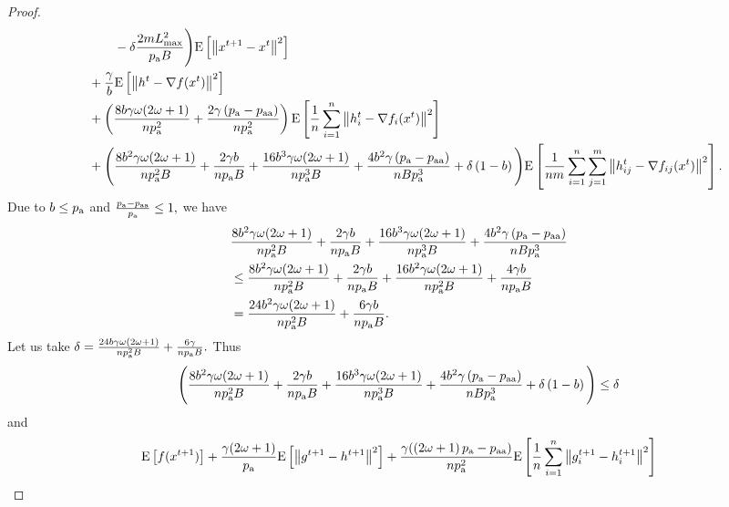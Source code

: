 \documentclass{article}
\newcommand*{\probavailable}{\ensuremath{p_{\textnormal{a}}}}
\newcommand*{\probpairaa}{\ensuremath{p_{\textnormal{aa}}}}
\begin{document}
\begin{proof}
\begin{align*}
      &\qquad\quad - \delta \frac{2 m L_{\max}^2}{\probavailable B} \Bigg) \Exp{\norm{x^{t+1} - x^t}^2} \\
      &\quad + \frac{\gamma}{b} \Exp{\norm{h^{t} - \nabla f(x^{t})}^2} \\
      &\quad + \left(\frac{8 b \gamma \omega (2 \omega + 1)}{n \probavailable^2} + \frac{2 \gamma \left(\probavailable - \probpairaa\right)}{n \probavailable^2}\right)\Exp{\frac{1}{n}\sum_{i=1}^n\norm{h^{t}_i - \nabla f_i(x^{t})}^2} \\
      &\quad + \Bigg(\frac{8 b^2 \gamma \omega (2 \omega + 1)}{n \probavailable^2 B} + \frac{2 \gamma b}{n \probavailable B} + \frac{16 b^3 \gamma \omega (2 \omega + 1)}{n \probavailable^3 B} + \frac{4 b^2 \gamma \left(\probavailable - \probpairaa\right)}{n B \probavailable^3} + \delta \left(1 - b\right)\Bigg)\Exp{\frac{1}{nm}\sum_{i=1}^n\sum_{j=1}^m\norm{h^{t}_{ij} - \nabla f_{ij}(x^{t})}^2}.
    \end{align*}
    Due to $b \leq \probavailable$ and $\frac{\probavailable - \probpairaa}{\probavailable} \leq 1,$ we have
    \begin{align*}
      &\frac{8 b^2 \gamma \omega (2 \omega + 1)}{n \probavailable^2 B} + \frac{2 \gamma b}{n \probavailable B} + \frac{16 b^3 \gamma \omega (2 \omega + 1)}{n \probavailable^3 B} + \frac{4 b^2 \gamma \left(\probavailable - \probpairaa\right)}{n B \probavailable^3} \\
      &\leq \frac{8 b^2 \gamma \omega (2 \omega + 1)}{n \probavailable^2 B} + \frac{2 \gamma b}{n \probavailable B} + \frac{16 b^2 \gamma \omega (2 \omega + 1)}{n \probavailable^2 B} + \frac{4 \gamma b}{n \probavailable B} \\
      &=\frac{24 b^2 \gamma \omega (2 \omega + 1)}{n \probavailable^2 B} + \frac{6 \gamma b}{n \probavailable B}.
    \end{align*}
    Let us take $\delta = \frac{24 b \gamma \omega (2 \omega + 1)}{n \probavailable^2 B} + \frac{6 \gamma }{n \probavailable B}.$ Thus
    \begin{align*}
      \Bigg(\frac{8 b^2 \gamma \omega (2 \omega + 1)}{n \probavailable^2 B} + \frac{2 \gamma b}{n \probavailable B} + \frac{16 b^3 \gamma \omega (2 \omega + 1)}{n \probavailable^3 B} + \frac{4 b^2 \gamma \left(\probavailable - \probpairaa\right)}{n B \probavailable^3} + \delta \left(1 - b\right)\Bigg) \leq \delta
    \end{align*}
    and
    \begin{align*}
      &\Exp{f(x^{t + 1})} + \frac{\gamma (2 \omega + 1)}{\probavailable} \Exp{\norm{g^{t+1} - h^{t+1}}^2} + \frac{\gamma (\left(2 \omega + 1\right)\probavailable - \probpairaa)}{n \probavailable^2} \Exp{\frac{1}{n}\sum_{i=1}^n\norm{g^{t+1}_i - h^{t+1}_i}^2}\\

\end{align*}
\end{proof}
\end{document}
